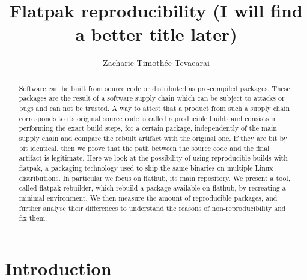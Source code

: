 \documentclass[a4paper,11pt,oneside]{report}
\title{Flatpak reproducibility (I will find a better title later)}
\author{Zacharie Timothée Tevaearai}
\theoremstyle{definition}
\newcommand{\sysname}{flatpak-rebuilder\xspace}
\newcommand{\rb}{reproducible builds\xspace}
\newcommand{\fp}{flatpak\xspace}
\newcommand{\fh}{flathub\xspace}
\begin{document}
\maketitle

\begin{abstract}
Software can be built from source code or distributed as pre-compiled packages.
    These packages are the result of a software supply chain which can be
    subject to attacks or bugs and can not be trusted. A way to attest that a
    product from such a supply chain corresponds to its original source code is
    called \rb and consists in performing the exact build steps, for a certain
    package, independently of the main supply chain and compare the rebuilt
    artifact with the original one. If they are bit by bit identical, then we
    prove that the path between the source code and the final artifact is
    legitimate. Here we look at the possibility of using reproducible builds
    with \fp, a packaging technology used to ship the same binaries on multiple
    Linux distributions. In particular we focus on \fh, its main repository. We
    present a tool, called \sysname, which rebuild a package available on \fh,
    by recreating a minimal environment. We then measure the amount of
    reproducible packages, and further analyse their differences to understand
    the reasons of non-reproducibility and fix them.
\end{abstract}

\maketoc

\chapter{Introduction}
\end{document}
